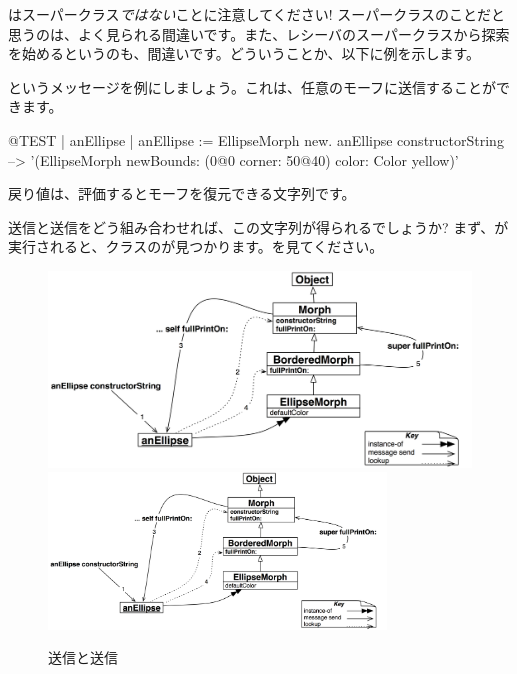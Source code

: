 \documentclass[a4paper,10pt,twoside]{book}
\begin{document}
\super はスーパークラス\emph{ではない}ことに注意してください! スーパークラスのことだと思うのは、よく見られる間違いです。また、レシーバのスーパークラスから探索を始めるというのも、間違いです。どういうことか、以下に例を示します。

というメッセージを例にしましょう。これは、任意のモーフに送信することができます。
\begin{code}{@TEST | anEllipse | anEllipse := EllipseMorph new.}
anEllipse constructorString --> '(EllipseMorph newBounds: (0@0 corner: 50@40) color: Color yellow)'
\end{code}
戻り値は、評価するとモーフを復元できる文字列です。

\self 送信と\super 送信をどう組み合わせれば、この文字列が得られるでしょうか? まず、が実行されると、クラスのが見つかります。を見てください。

\begin{figure}[htb]
\begin{center}
\ifluluelse
	{\includegraphics[width=\textwidth]{constructorStringLookup}}
	{\includegraphics[width=0.8\textwidth]{constructorStringLookup}}
\caption{\self 送信と\super 送信}
\end{center}
\end{figure}
\end{document}

